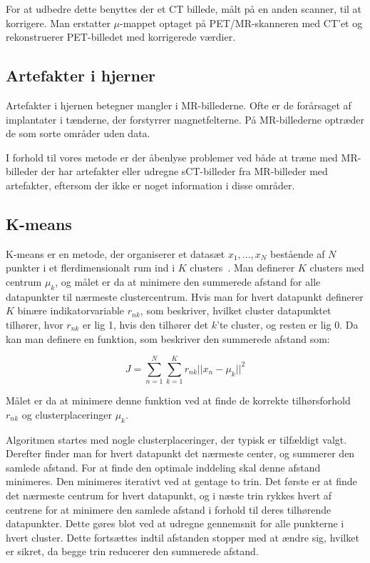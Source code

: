 For at udbedre dette benyttes der et CT billede, målt
på en an\-den scan\-ner, til at korrigere. Man erstatter $\mu$-mappet
optaget på PET/\-MR-skanneren med CT'et og rekonstruerer PET-billedet med
korrigerede værdier.

\subsection{Artefakter i hjerner}

Artefakter i hjernen betegner mangler i MR-billederne. Ofte er de
forårsaget af implantater i tænderne, der forstyrrer magnetfelterne.
På MR-billederne optræder de som sorte områder uden data.

I forhold til vores metode er der åbenlyse problemer ved både at
træne med MR-billeder der har artefakter eller udregne sCT-billeder fra
MR-billeder med artefakter, eftersom der ikke er noget
information i disse områder.


\subsection{K-means}

K-means er en metode, der organiserer et datasæt ${x_1,...,x_N}$
bestående af $N$ punkter i et flerdimensionalt rum ind i $K$ clusters~\cite{bishop}.
Man definerer $K$ clusters med centrum $\mu_k$, og målet er da at
minimere den summerede afstand for alle datapunkter til nærmeste clustercentrum. Hvis man for hvert datapunkt definerer $K$ binære indikatorvariable $r_{nk}$, som beskriver, hvilket cluster datapunktet tilhører,
hvor $r_{nk}$ er lig 1, hvis den tilhører det $k$'te cluster, og resten
er lig 0. Da kan man definere en funktion, som beskriver den summerede
afstand som:

$$
J = \sum_{n=1}^{N} \sum_{k=1}^{K} r_{nk} || x_n - \mu_k ||^2
$$

Målet er da at minimere denne funktion ved at finde de korrekte
tilhørsforhold $r_{nk}$ og clusterplaceringer $\mu_k$.

Algoritmen startes med nogle clusterplaceringer, der typisk
er tilfældigt valgt. Derefter finder man for hvert datapunkt det
nærmeste center, og summerer den samlede afstand. For at finde den
optimale inddeling skal denne afstand minimeres. Den minimeres iterativt
ved at gentage to trin. Det første er at finde det nærmeste centrum for
hvert datapunkt, og i næste trin rykkes hvert af centrene for at minimere
den samlede afstand i forhold til deres tilhørende datapunkter. Dette
gøres blot ved at udregne gennemsnit for alle punkterne i hvert cluster. Dette
fortsættes indtil afstanden stopper med at ændre sig, hvilket er sikret,
da begge trin reducerer den summerede afstand.

